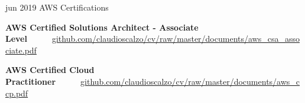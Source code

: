 



\begin{cventries}

	\cvproj
        {jun 2019}
        {AWS Certifications}
        {}
        {}
        {
            \begin{cvitems}
                \item \textbf{AWS Certified Solutions Architect - Associate Level}~~~\textbullet~~~\href{https://github.com/claudioscalzo/cv/raw/master/documents/aws\_csa\_associate.pdf}{github.com/claudioscalzo/cv/raw/master/documents/aws\_csa\_associate.pdf}
                \item \textbf{AWS Certified Cloud Practitioner}~~~\textbullet~~~\href{https://github.com/claudioscalzo/cv/raw/master/documents/aws\_ccp.pdf}{github.com/claudioscalzo/cv/raw/master/documents/aws\_ccp.pdf}
            \end{cvitems}
        }
\end{cventries}
